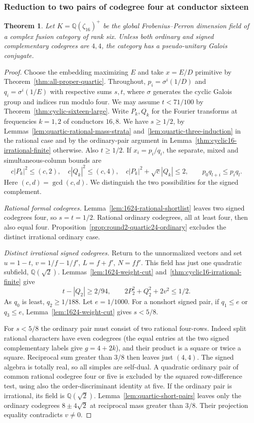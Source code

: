 \documentclass[11pt,reqno]{amsart}
\newtheorem{theorem}{Theorem}[section]
\theoremstyle{remark}\newtheorem{remark}[theorem]{Remark}
\numberwithin{equation}{section}
\begin{document}
\subsubsection{Reduction to two pairs of codegree four at conductor sixteen}
\begin{theorem}\label{thm:round2-sixteen}
Let $K=\mathbb Q(\zeta_{16})^+$ be the global Frobenius--Perron dimension field of a complex fusion category of rank six. Unless both ordinary and signed complementary codegrees are $4,4$, the category has a pseudo-unitary Galois conjugate.
\end{theorem}
\begin{proof}
Choose the embedding maximizing $E$ and take $x=E/D$ primitive by Theorem~\ref{thm:all-proper-quartic}. Throughout, $p_i=\sigma^i(1/D)$ and $q_i=\sigma^i(1/E)$ with respective sums $s,t$, where $\sigma$ generates the cyclic Galois group and indices run modulo four. We may assume $t<71/100$ by Theorem~\ref{thm:cyclic-sixteen-large}. Write $P_k,Q_k$ for the Fourier transforms at frequencies $k=1,2$ of conductors $16,8$. We have $s\ge1/2$, by Lemmas~\ref{lem:quartic-rational-mass-strata} and~\ref{lem:quartic-three-induction} in the rational case and by the ordinary-pair argument in Lemma~\ref{thm:cyclic16-irrational-finite} otherwise. Also $t\ge1/2$. If $x_i=p_i/q_i$, the separate, mixed and simultaneous-column bounds are
\[
 c|P_k|^2\le(c,2),\quad c|Q_k|^2\le(c,4),\quad
 c|P_k|^2+\sqrt c|Q_k|\le2,\qquad p_0q_{l+i}\le p_iq_l.
\]
Here $(c,d)=\gcd(c,d)$. We distinguish the two possibilities for the signed complement.

\smallskip\noindent\emph{Rational formal codegrees.}
Lemma~\ref{lem:1624-rational-shortlist} leaves two signed codegrees
four, so $s=t=1/2$. Rational ordinary codegrees, all at least four,
then also equal four.
Proposition~\ref{prop:round2-quartic24-ordinary} excludes the
distinct irrational ordinary case.

\smallskip\noindent\emph{Distinct irrational signed codegrees.}
Return to the unnormalized vectors and set $u=1-t$, $v=1/f-1/f'$, $L=f+f'$, $N=ff'$. This field has just one quadratic subfield, $\mathbb Q(\sqrt2)$. Lemmas~\ref{lem:1624-weight-cut} and~\ref{thm:cyclic16-irrational-finite} give
\[
 t-|Q_2|\ge 2/94,\qquad 2P_2^2+Q_2^2+2v^2\le1/2.
\]
As $q_0$ is least, $q_2\ge1/188$. Let $e=1/1000$. For a nonshort signed pair, if $q_1\le e$ or
$q_3\le e$, Lemma~\ref{lem:1624-weight-cut} gives $s<5/8$.

For $s<5/8$ the ordinary pair must consist of two rational four-rows. Indeed split rational characters have even codegrees (the equal entries at the two signed complementary labels give $g=4+2k$), and their product is a square or twice a square. Reciprocal sum greater than $3/8$ then leaves just $(4,4)$. The signed algebra is totally real, so all simples are self-dual. A quadratic ordinary pair of common rational codegree four or five is excluded by the squared row-difference test, using also the order-discriminant identity at five. If the ordinary pair is irrational, its field is $\mathbb Q(\sqrt2)$.
Lemma~\ref{lem:quartic-short-pairs} leaves only the ordinary codegrees
$8\pm4\sqrt2$ at reciprocal mass greater than $3/8$.
Their projection equality contradicts $v\ne0$.


\end{proof}
\end{document}
